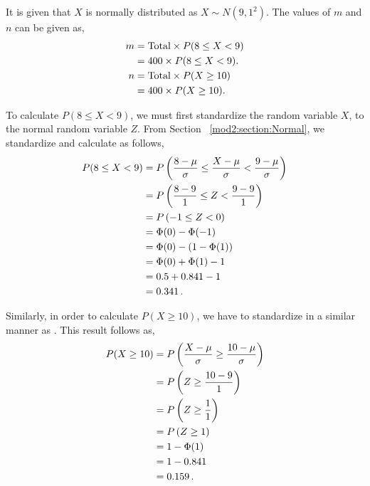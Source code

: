 \begin{subquestions}
\subquestion

\begin{subsubquestions}
	
\subsubquestion

It is given that $X$ is normally distributed as $X \sim N(9,1^2)$. The values of $m$ and $n$ can be given as,
\begin{align}
	m & = \text{Total} \times P(8 \leq X < 9) \nonumber \\
	  & = 400 \times P(8 \leq X < 9). \\
    n & = \text{Total} \times P(X \geq 10) \nonumber \\
      & = 400 \times P(X \geq 10). \label{2015:q4:MNeqn}
\end{align}
	
To calculate $P(8 \leq X < 9)$, we must first standardize the random variable $X$, to the normal random variable $Z$. From Section ~\ref{mod2:section:Normal}, we standardize and calculate as follows,
\begin{align}
	P(8 \leq X < 9) & = P\left(\frac{8- \mu}{\sigma} \leq \frac{X-\mu}{\sigma} < \frac{9-\mu}{\sigma} \right) \nonumber \\
	                & = P\left(\frac{8- 9}{1} \leq Z < \frac{9-9}{1} \right) \nonumber \\
	                & = P\left(-1 \leq Z < 0 \right) \nonumber \\
	                & = \Phi(0) - \Phi(-1) \nonumber \\
	                & = \Phi(0) - (1 - \Phi(1)) \nonumber \\
	                & = \Phi(0) + \Phi(1) - 1 \nonumber \\
	                & = 0.5 + 0.841 - 1 \nonumber \\
	                & = 0.341 \,. \label{2015:q4:Normal1}
\end{align}

Similarly, in order to calculate $P(X \geq 10)$, we have to standardize in a similar manner as . This result follows as,
\begin{align}
	P(X \geq 10) & = P\left(\frac{X-\mu}{\sigma} \geq \frac{10 - \mu}{\sigma} \right) \nonumber \\
	             & = P\left(Z \geq \frac{10-9}{1}\right) \nonumber \\
	             & = P\left(Z \geq \frac{1}{1}\right) \nonumber \\
	             & = P\left(Z \geq 1\right) \nonumber \\
	             & = 1 - \Phi(1) \nonumber \\
	             & = 1 - 0.841 \nonumber \\
	             & = 0.159 \,. \label{2015:q4:Normal2}
\end{align}


\end{subsubquestions}
\end{subquestions}
